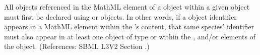 All \Species objects referenced in the MathML  element of a
\KineticLaw object within a given \Reaction object must first be declared
using \SpeciesReference or \ModifierSpeciesReference objects.  In other
words, if a \Species object identifier appears in a MathML 
element within the \Reaction's \KineticLaw {} content, that same
species' identifier must also appear in at least one object of type
\SpeciesReference or \ModifierSpeciesReference within the
,  and/or
 elements of the \Reaction object.  (References:
SBML L3V2 Section .)

